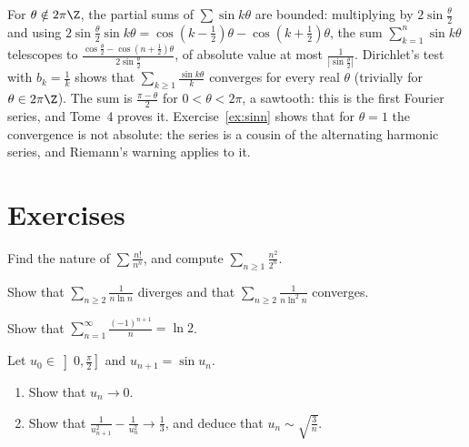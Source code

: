 \begin{examplex}
For $\theta\notin2\pi\Z$, the partial sums of $\sum\sin k\theta$ are bounded: multiplying by $2\sin\frac\theta2$ and using $2\sin\frac\theta2\sin k\theta=\cos\left(k-\frac12\right)\theta-\cos\left(k+\frac12\right)\theta$,
the sum $\sum_{k=1}^n\sin k\theta$ telescopes to $\frac{\cos\frac\theta2-\cos\left(n+\frac12\right)\theta}{2\sin\frac\theta2}$, of absolute value at most $\frac1{|\sin\frac\theta2|}$. Dirichlet's test with $b_k=\frac1k$
shows that $\sum_{k\ge1}\frac{\sin k\theta}k$ converges for every real $\theta$ (trivially for $\theta\in2\pi\Z$). The sum is $\frac{\pi-\theta}2$ for $0<\theta<2\pi$, a sawtooth: this is the
first Fourier series, and Tome~4 proves it. Exercise~\ref{ex:sinn} shows that for $\theta=1$ the convergence is not absolute: the series is a cousin of the alternating harmonic
series, and Riemann's warning applies to it.
\end{examplex}


\section{Exercises}

\begin{exercise}[$\star$]\label{ex:nature}
Find the nature of $\sum\frac{n!}{n^n}$, and compute $\sum_{n\ge1}\frac{n^2}{2^n}$.
\end{exercise}

\begin{exercise}[$\star$]\label{ex:bertrand}
Show that $\sum_{n\ge2}\frac1{n\ln n}$ diverges and that $\sum_{n\ge2}\frac1{n\ln^2n}$ converges.
\end{exercise}

\begin{exercise}[$\star\star$]\label{ex:ln2}
Show that $\displaystyle\sum_{n=1}^\infty\frac{(-1)^{n+1}}n=\ln2$.
\end{exercise}

\begin{exercise}[$\star\star$]\label{ex:sin}
Let $u_0\in\left]0,\frac\pi2\right]$ and $u_{n+1}=\sin u_n$.
\begin{enumerate}[label=(\alph*)]
\item Show that $u_n\to0$.
\item Show that $\frac1{u_{n+1}^2}-\frac1{u_n^2}\to\frac13$, and deduce that $u_n\sim\sqrt{\frac3n}$.
\end{enumerate}
\end{exercise}

